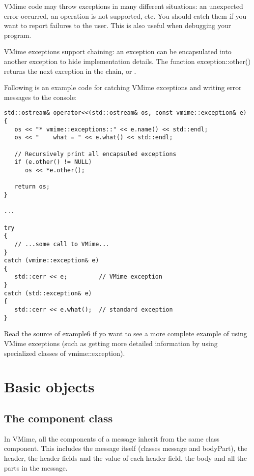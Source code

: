 VMime code may throw exceptions in many different situations: an unexpected
error occurred, an operation is not supported, etc. You should catch them if
you want to report failures to the user. This is also useful when debugging
your program.

VMime exceptions support chaining: an exception can be encapsulated into
another exception to hide implementation details. The function
{\vcode exception::other()} returns the next exception in the chain,
or \vnull.

Following is an example code for catching VMime exceptions and writing error
messages to the console:

\begin{lstlisting}[caption={Catching VMime exceptions}]
std::ostream& operator<<(std::ostream& os, const vmime::exception& e)
{
   os << "* vmime::exceptions::" << e.name() << std::endl;
   os << "    what = " << e.what() << std::endl;

   // Recursively print all encapsuled exceptions
   if (e.other() != NULL)
      os << *e.other();

   return os;
}

...

try
{
   // ...some call to VMime...
}
catch (vmime::exception& e)
{
   std::cerr << e;         // VMime exception
}
catch (std::exception& e)
{
   std::cerr << e.what();  // standard exception
}
\end{lstlisting}

Read the source of {\vexample example6} if yo want to see a more complete
example of using VMime exceptions (such as getting more detailed information
by using specialized classes of {\vcode vmime::exception}).


\section{Basic objects}

\subsection{The {\vcode component} class} %

In VMime, all the components of a message inherit from the same class
{\vcode component}. This includes the message itself (classes {\vcode message}
and {\vcode bodyPart}), the header, the header fields and the value of each
header field, the body and all the parts in the message.

